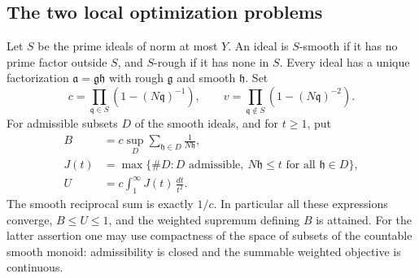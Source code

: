 \subsection{The two local optimization problems}

Let $S$ be the prime ideals of norm at most $Y$.  An ideal is
$S$-smooth if it has no prime factor outside $S$, and $S$-rough if it
has none in $S$.  Every ideal has a unique factorization
$\mathfrak a=\mathfrak g\mathfrak h$ with rough $\mathfrak g$ and
smooth $\mathfrak h$.  Set
\[
 c=\prod_{\mathfrak q\in S}(1-(N\mathfrak q)^{-1}),\qquad
 v=\prod_{\mathfrak q\notin S}(1-(N\mathfrak q)^{-2}).
\]
For admissible subsets $D$ of the smooth ideals, and for $t\ge1$, put
\begin{align}
 B&=c\sup_D\sum_{\mathfrak h\in D}\frac1{N\mathfrak h},\\
 J(t)&=\max\{\#D:D\text{ admissible},\ N\mathfrak h\le t
                         \text{ for all }\mathfrak h\in D\},\\
 U&=c\int_1^\infty J(t)\,\frac{dt}{t^2}.
\end{align}
The smooth reciprocal sum is exactly $1/c$.  In particular all these
expressions converge, $B\le U\le1$, and the weighted supremum defining
$B$ is attained.  For the latter assertion one may use compactness of
the space of subsets of the countable smooth monoid: admissibility is
closed and the summable weighted objective is continuous.

